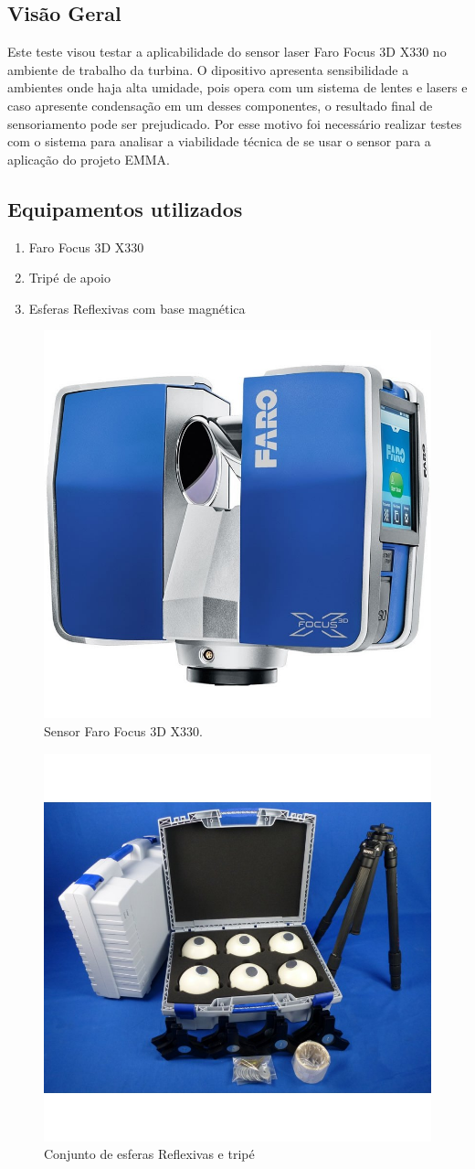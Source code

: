 \subsection{Visão Geral}
Este teste visou testar a aplicabilidade do sensor laser Faro Focus 3D X330 no
ambiente de trabalho da turbina. O dipositivo apresenta sensibilidade a
ambientes onde haja alta umidade, pois opera com um sistema de lentes e lasers e
caso apresente condensação em um desses componentes, o resultado final de
sensoriamento pode ser prejudicado. Por esse motivo foi necessário realizar
testes com o sistema para analisar a viabilidade técnica de se usar o sensor
para a aplicação do projeto EMMA. 


\subsection{Equipamentos utilizados}

\begin{enumerate}
\item Faro Focus 3D X330 
\item Tripé de apoio
\item Esferas Reflexivas com base magnética
\end{enumerate}

\begin{figure}[h!]
\centering
	\includegraphics[width=0.4\columnwidth]{figs/faro/sensor}
	\caption{Sensor Faro Focus 3D X330.}
	\label{fig::sensor}
\end{figure}

\begin{figure}[h!]
\centering
	\includegraphics[width=0.5\columnwidth]{figs/faro/kit}
	\caption{Conjunto de esferas Reflexivas e tripé}
	\label{fig::kit}
\end{figure}


